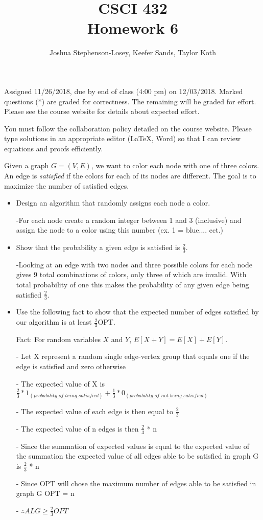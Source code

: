 \documentclass[12pt]{article}
\author{Joshua Stephenson-Losey,
Keefer Sands,
Taylor Koth}
\newenvironment{problem}[2][Problem]
{\begin{trivlist}
\item[\hskip \labelsep {\bfseries #1}\hskip \labelsep {\bfseries #2.}]}{\end{trivlist}}
\begin{document}
 
\title{CSCI 432\\Homework 6}
\date{}
\maketitle

Assigned 11/26/2018, due by end of class (4:00 pm) on 12/03/2018. Marked questions (*) are graded for correctness. The remaining will be graded for effort. Please see the course website for details about expected effort.

You must follow the collaboration policy detailed on the course website. Please type solutions in an appropriate editor (\LaTeX, Word) so that I can review equations and proofs efficiently. 

\begin{problem}{1*}
Given a graph $G=(V,E)$, we want to color each node with one of three colors. An edge is \textit{satisfied} if the colors for each of its nodes are different. The goal is to maximize the number of satisfied edges.

\begin{itemize}
\item Design an algorithm that randomly assigns each node a color.

-For each node create a random integer between 1 and 3 (inclusive) and assign the node to a color using this number (ex. 1 = blue.... ect.)

\item Show that the probability a given edge is satisfied is $\frac{2}{3}$.

-Looking at an edge with two nodes and three possible colors for each node gives 9 total combinations of colors, only three of which are invalid. With total probability of one this makes the probability of any given edge being satisfied $\frac{2}{3}$.

\item Use the following fact to show that the expected number of edges satisfied by our algorithm is at least $\frac{2}{3}$OPT. 

Fact: For random variables $X$ and $Y$, $E[X+Y] = E[X]+E[Y]$.

- Let X represent a random single edge-vertex group that equals one if the edge is satisfied and zero otherwise

- The expected value of X is $\frac{2}{3} * 1_{(probability\_of\_being\_satisfied)} + \frac{1}{3} * 0_{(probability\_of\_not\_being\_satisfied)}$

- The expected value of each edge is then equal to $\frac{2}{3}$

- The expected value of n edges is then $\frac{2}{3}$ * n

- Since the summation of expected values is equal to the expected value of the summation the expected value of all edges able to be satisfied in graph G is $\frac{2}{3}$ * n

- Since OPT will chose the maximum number of edges able to be satisfied in graph G OPT = n

- $\therefore ALG \ge \frac{2}{3} OPT$
\end{itemize}
\end{problem}
\end{document}
